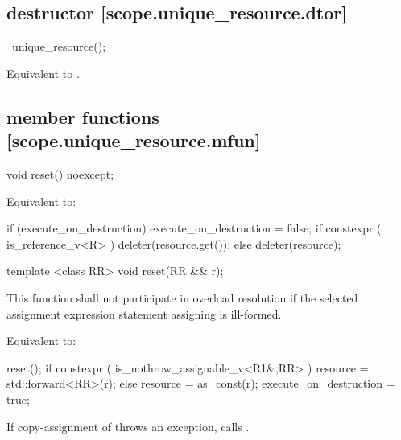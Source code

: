 \documentclass[ebook,11pt,article]{memoir}
\begin{document}
\subsection { destructor [scope.unique_resource.dtor]}

\begin{itemdecl}
~unique_resource();
\end{itemdecl}

\begin{itemdescr}
\pnum
\effects 
Equivalent to .
\end{itemdescr}

\subsection { member functions [scope.unique_resource.mfun]}

\begin{itemdecl}
void reset() noexcept;
\end{itemdecl}

\begin{itemdescr}
\pnum
\effects
Equivalent to:
\begin{codeblock}
if (execute_on_destruction) {
    execute_on_destruction = false;
    if constexpr ( is_reference_v<R> ) 
        deleter(resource.get());
    else 
        deleter(resource);
}
\end{codeblock}
\end{itemdescr}

\begin{itemdecl}
template <class RR>
void reset(RR && r);
\end{itemdecl}

\begin{itemdescr}
\pnum
\remarks This function  shall not participate in overload resolution if the selected assignment expression statement assigning  is ill-formed.

\pnum
\effects 
Equivalent to:
\begin{codeblock}
reset();
if constexpr ( is_nothrow_assignable_v<R1&,RR> )
    resource = std::forward<RR>(r);
else
    resource = as_const(r);
execute_on_destruction = true;
\end{codeblock}

If copy-assignment of  throws an exception, calls .
\end{itemdescr}
\end{document}
